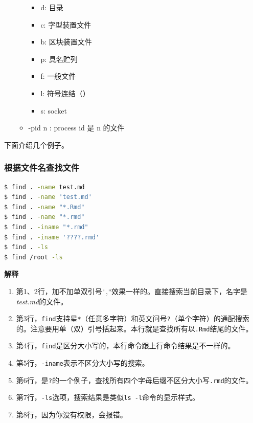 \documentclass[doctor,openright,twoside]{sjtuthesis}
\providecommand{\tightlist}{%
    \setlength{\itemsep}{0pt}\setlength{\parskip}{0pt}}
\newcommand{\passthrough}[1]{#1}
\theoremstyle{plain}
\theoremstyle{definition}
\theoremstyle{remark}
\theoremstyle{ocrenumbox}
\theoremstyle{plain}
\begin{document}
\begin{enumerate}
\begin{itemize}
    \begin{itemize}
    \tightlist
    \item
      d: 目录
    \item
      c: 字型装置文件
    \item
      b: 区块装置文件
    \item
      p: 具名贮列
    \item
      f: 一般文件
    \item
      l: 符号连结（）
    \item
      s: socket
    \end{itemize}
  \item
    -pid n : process id 是 n 的文件
  \end{itemize}
\end{enumerate}

下面介绍几个例子。

\subsubsection{根据文件名查找文件}

\begin{lstlisting}[language=bash]
$ find . -name test.md
$ find . -name 'test.md'
$ find . -name "*.Rmd"
$ find . -name "*.rmd"
$ find . -iname "*.rmd"
$ find . -iname '????.rmd'
$ find . -ls
$ find /root -ls
\end{lstlisting}

\textbf{解释}

\begin{enumerate}
\def\labelenumi{\arabic{enumi}.}
\tightlist
\item
  第1、2行，加不加单双引号\passthrough{\lstinline!'!},\passthrough{\lstinline!"!}效果一样的。直接搜索当前目录下，名字是\emph{test.md}的文件。
\item
  第3行，\passthrough{\lstinline!find!}支持星\passthrough{\lstinline!*!}（任意多字符）和英文问号\passthrough{\lstinline!?!}（单个字符）的通配搜索的。注意要用单（双）引号括起来。本行就是查找所有以\passthrough{\lstinline!.Rmd!}结尾的文件。
\item
  第4行，\passthrough{\lstinline!find!}是区分大小写的，本行命令跟上行命令结果是不一样的。
\item
  第5行，\passthrough{\lstinline!-iname!}表示不区分大小写的搜索。
\item
  第6行，是\passthrough{\lstinline!?!}的一个例子，查找所有四个字母后缀不区分大小写\passthrough{\lstinline!.rmd!}的文件。
\item
  第7行，\passthrough{\lstinline!-ls!}选项，搜索结果是类似\passthrough{\lstinline!ls -l!}命令的显示样式。
\item
  第8行，因为你没有权限，会报错。
\end{enumerate}
\end{document}
